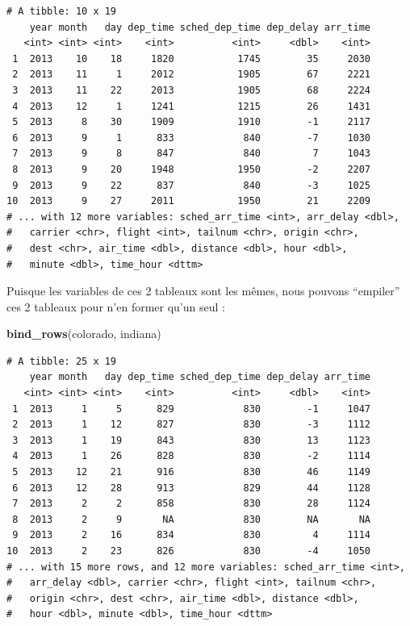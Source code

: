 \documentclass[
  a4paper,
]{article}
\newenvironment{Shaded}{\begin{snugshade}}{\end{snugshade}}
\newcommand{\KeywordTok}[1]{\textcolor[rgb]{0.12,0.11,0.11}{\textbf{#1}}}
\newcommand{\NormalTok}[1]{\textcolor[rgb]{0.12,0.11,0.11}{#1}}
\begin{document}
\begin{verbatim}
# A tibble: 10 x 19
    year month   day dep_time sched_dep_time dep_delay arr_time
   <int> <int> <int>    <int>          <int>     <dbl>    <int>
 1  2013    10    18     1820           1745        35     2030
 2  2013    11     1     2012           1905        67     2221
 3  2013    11    22     2013           1905        68     2224
 4  2013    12     1     1241           1215        26     1431
 5  2013     8    30     1909           1910        -1     2117
 6  2013     9     1      833            840        -7     1030
 7  2013     9     8      847            840         7     1043
 8  2013     9    20     1948           1950        -2     2207
 9  2013     9    22      837            840        -3     1025
10  2013     9    27     2011           1950        21     2209
# ... with 12 more variables: sched_arr_time <int>, arr_delay <dbl>,
#   carrier <chr>, flight <int>, tailnum <chr>, origin <chr>,
#   dest <chr>, air_time <dbl>, distance <dbl>, hour <dbl>,
#   minute <dbl>, time_hour <dttm>
\end{verbatim}

Puisque les variables de ces 2 tableaux sont les mêmes, nous pouvons ``empiler'' ces 2 tableaux pour n'en former qu'un seul :

\begin{Shaded}
\begin{Highlighting}[]
\KeywordTok{bind_rows}\NormalTok{(colorado, indiana)}
\end{Highlighting}
\end{Shaded}

\begin{verbatim}
# A tibble: 25 x 19
    year month   day dep_time sched_dep_time dep_delay arr_time
   <int> <int> <int>    <int>          <int>     <dbl>    <int>
 1  2013     1     5      829            830        -1     1047
 2  2013     1    12      827            830        -3     1112
 3  2013     1    19      843            830        13     1123
 4  2013     1    26      828            830        -2     1114
 5  2013    12    21      916            830        46     1149
 6  2013    12    28      913            829        44     1128
 7  2013     2     2      858            830        28     1124
 8  2013     2     9       NA            830        NA       NA
 9  2013     2    16      834            830         4     1114
10  2013     2    23      826            830        -4     1050
# ... with 15 more rows, and 12 more variables: sched_arr_time <int>,
#   arr_delay <dbl>, carrier <chr>, flight <int>, tailnum <chr>,
#   origin <chr>, dest <chr>, air_time <dbl>, distance <dbl>,
#   hour <dbl>, minute <dbl>, time_hour <dttm>
\end{verbatim}
\end{document}
